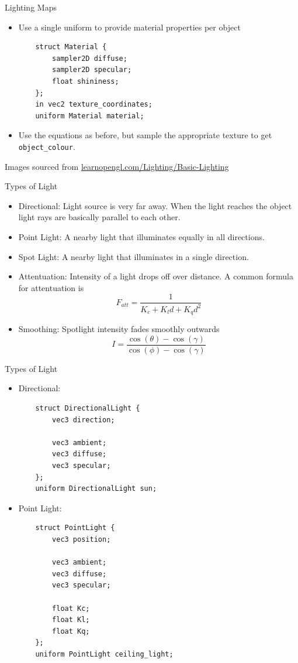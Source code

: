 \documentclass{beamer}
\begin{document}
\begin{frame}[fragile]{Lighting Maps}
\begin{itemize}
\begin{center}
        \end{center}
        \item Use a single uniform to provide material properties per object
\footnotesize{
\begin{verbatim}
    struct Material {
        sampler2D diffuse;
        sampler2D specular;
        float shininess;
    };
    in vec2 texture_coordinates;
    uniform Material material;
\end{verbatim}
}
        \item Use the equations as before, but sample the appropriate texture to get {\color{blue}\verb"object_colour"}.
    \end{itemize}
    \vfill{}
    {\footnotesize{Images sourced from \url{learnopengl.com/Lighting/Basic-Lighting}}}
\end{frame}

\begin{frame}[fragile]{Types of Light}
    \begin{itemize}
        \item Directional: Light source is very far away. When the light reaches the object 
            light rays are basically parallel to each other.
        \item Point Light: A nearby light that illuminates equally in all directions.
        \item Spot Light: A nearby light that illuminates in a single direction.
        \item Attentuation: Intensity of a light drops off over distance. A common formula for 
            attentuation is
            \[F_{att} = \frac{1}{K_{c} + K_{l}d + K_{q}d^{2}}\]
        \item Smoothing: Spotlight intensity fades smoothly outwards
        \[I = \frac{\cos\left(\theta\right) - \cos\left(\gamma\right)}{\cos\left(\phi\right) - \cos\left(\gamma\right)}\]
    \end{itemize}
\end{frame}

\begin{frame}[fragile]{Types of Light}
    \begin{itemize}
        \item Directional:
\footnotesize{
\begin{verbatim}
    struct DirectionalLight {
        vec3 direction;

        vec3 ambient;
        vec3 diffuse;
        vec3 specular;
    };
    uniform DirectionalLight sun;
\end{verbatim}
}
        \item Point Light:
\footnotesize{
\begin{verbatim}
    struct PointLight {
        vec3 position;

        vec3 ambient;
        vec3 diffuse;
        vec3 specular;

        float Kc;
        float Kl;
        float Kq;
    };
    uniform PointLight ceiling_light;
\end{verbatim}
}
    \end{itemize}
\end{frame}
\end{document}
